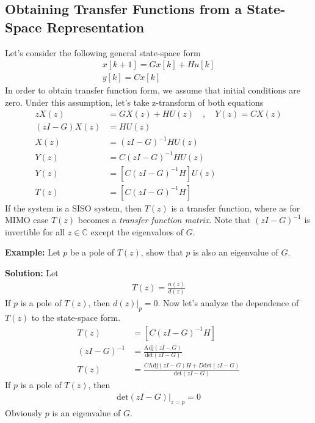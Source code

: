 \documentclass[twoside]{article}
\begin{document}
\subsection*{Obtaining Transfer Functions from a State-Space
  Representation}

Let's consider the following general state-space form
%
\begin{align*}
  x[k+1] = G x[k] + H u[k]
\\
  y[k] = C x[k] 
\end{align*}
%
In order to obtain transfer function form,
we assume that initial conditions are zero.
Under this assumption, let's take z-transform
of both equations
%
\begin{align*}
  z X(z) &= G X(z) + H U(z) 
\quad , \quad
  Y(z) = C X(z) 
\\
\left(z I - G \right) X(z) &= H U(z) 
\\
X(z) &= \left(z I - G \right)^{-1} H U(z)
\\
Y(z) &= C \left(z I - G \right)^{-1} H U(z) 
\\
Y(z) &= \left[ C \left(z I - G \right)^{-1} H  \right] U(z)
\\
T(z) & = \left[ C \left(z I - G \right)^{-1} H  \right]
\end{align*}
%
If the system is a SISO system, then $T(z)$ is a transfer function,
where as for MIMO case $T(z)$ becomes a \textit{transfer function
  matrix}. Note that $\left(z I - G \right)^{-1}$ is invertible for
all $z \in \mathbb{C}$ except the eigenvalues of $G$. 

\vspace{24pt}

\textbf{Example:} Let $p$ be a pole of $T(z)$, show that
$p$ is also an eigenvalue of $G$. 

\textbf{Solution:} Let 
%
\begin{align*}
  T(z) = \frac{n(z)}{d(z)}
\end{align*}
%
If $p$ is a pole of $T(z)$, then $d(z)|_{p} = 0$. Now let's analyze
the dependence of $T(z)$ to the state-space form. 
%
\begin{align*}
  T(z) &= \left[ C \left(z I - G \right)^{-1} H  \right]
\\
  \left(z I - G \right)^{-1} &= 
\frac{\mathrm{Adj} \left(z I - G \right) }{\mathrm{det} \left(z I - G
                               \right) }
\\
 T(z) &= \frac{C \mathrm{Adj} \left(z I - G \right) H + D \mathrm{det}
        \left(z I - G
                               \right)}{\mathrm{det} \left(z I - G
                               \right) }
\end{align*}
%
If $p$ is a pole of $T(z)$, then 
%
\begin{align*}
\mathrm{det} \left(z I - G \right)|_{z = p} = 0
\end{align*}
%
Obviously $p$ is an eigenvalue of $G$.
\end{document}
